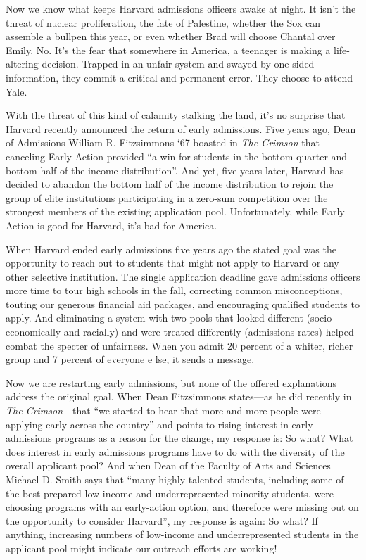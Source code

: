 
Now we know what keeps Harvard admissions officers awake at night. It isn't
the threat of nuclear proliferation, the fate of Palestine, whether the Sox
can assemble a bullpen this year, or even whether Brad will choose Chantal
over Emily. No. It's the fear that somewhere in America, a teenager is making
a life-altering decision. Trapped in an unfair system and swayed by one-sided
information, they commit a critical and permanent error. They choose to
attend Yale.

With the threat of this kind of calamity stalking the land, it's no surprise
that Harvard recently announced the return of early admissions. Five years
ago, Dean of Admissions William R. Fitzsimmons `67 boasted in \textit{The
Crimson} that canceling Early Action provided ``a win for students in the
bottom quarter and bottom half of the income distribution''. And yet, five
years later, Harvard has decided to abandon the bottom half of the income
distribution to rejoin the group of elite institutions participating in a
zero-sum competition over the strongest members of the existing application
pool. Unfortunately, while Early Action is good for Harvard, it's bad for
America.

When Harvard ended early admissions five years ago the stated goal was the
opportunity to reach out to students that might not apply to Harvard or any
other selective institution. The single application deadline gave admissions
officers more time to tour high schools in the fall, correcting common
misconceptions, touting our generous financial aid packages, and encouraging
qualified students to apply. And eliminating a system with two pools that
looked different (socio-economically and racially) and were treated
differently (admissions rates) helped combat the specter of unfairness. When
you admit 20 percent of a whiter, richer group and 7 percent of everyone
e lse, it sends a message.

Now we are restarting early admissions, but none of the offered explanations
address the original goal. When Dean Fitzsimmons states---as he did recently
in \textit{The Crimson}---that ``we started to hear that more and more people
were applying early across the country'' and points to rising interest in
early admissions programs as a reason for the change, my response is: So
what? What does interest in early admissions programs have to do with the
diversity of the overall applicant pool? And when Dean of the Faculty of Arts
and Sciences Michael D. Smith says that ``many highly talented students,
including some of the best-prepared low-income and underrepresented minority
students, were choosing programs with an early-action option, and therefore
were missing out on the opportunity to consider Harvard'', my response is
again: So what? If anything, increasing numbers of low-income and
underrepresented students in the applicant pool might indicate our outreach
efforts are working!


